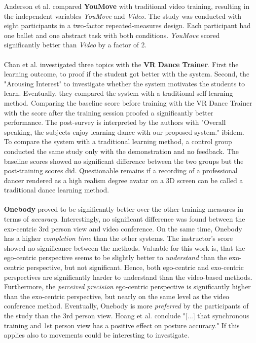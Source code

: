 Anderson et al. compared \textbf{YouMove} with traditional video training, resulting in the independent variables \textit{YouMove} and \textit{Video}. The study was conducted with eight participants in a two-factor repeated-measures design. Each participant had one ballet and one abstract task with both conditions. \textit{YouMove} scored significantly better than \textit{Video} by a factor of 2.\\ \\
Chan et al. \cite{Chan2010} investigated three topics with the \textbf{VR Dance Trainer}. First the learning outcome, to proof if the student got better with the system. Second, the "Arousing Interest" to investigate whether the system motivates the students to learn. Eventually, they compared the system with a traditional self-learning method. Comparing the baseline score before training with the VR Dance Trainer with the score after the training session proofed a significantly better performance. The post-survey is interpreted by the authors with "Overall speaking, the subjects enjoy learning dance with our proposed system." ibidem. To compare the system with a traditional learning method, a control group conducted the same study only with the demonstration and no feedback. The baseline scores showed no significant difference between the two groups but the post-training scores did. Questionable remains if a recording of a professional dancer rendered as a high realism degree avatar on a 3D screen can be called a traditional dance learning method.\\ \\
\textbf{Onebody} \cite{Hoang2016} proved to be significantly better over the other training measures in terms of \textit{accuracy}. Interestingly, no significant difference was found between the exo-centric 3rd person view and video conference. On the same time, Onebody has a higher \textit{completion time} than the other systems. The instructor's score showed no significance between the methods. Valuable for this work is, that the ego-centric perspective seems to be slightly better to \textit{understand} than the exo-centric perspective, but not significant. Hence, both ego-centric and exo-centric perspectives are significantly harder to understand than the video-based methods. Furthermore, the \textit{perceived precision} ego-centric perspective is significantly higher than the exo-centric perspective, but nearly on the same level as the video conference method. Eventually, Onebody is more \textit{preferred} by the participants of the study than the 3rd person view. Hoang et al. conclude "[...] that synchronous training and 1st person view has a positive effect on posture accuracy."\cite{Hoang2016} If this applies also to movements could be interesting to investigate.\\ \\
